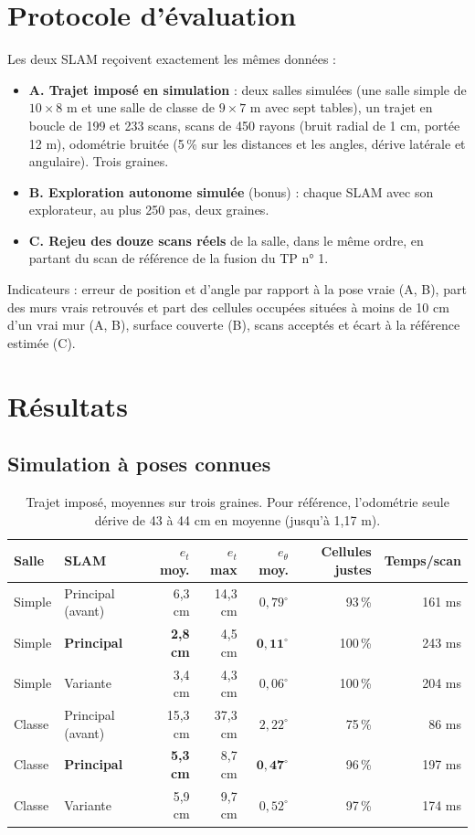 \documentclass[11pt,a4paper]{article}
\begin{document}
\section{Protocole d'évaluation}
Les deux SLAM reçoivent exactement les mêmes données :
\begin{itemize}
\item \textbf{A. Trajet imposé en simulation} : deux salles simulées (une
salle simple de $10\times8$ m et une salle de classe de $9\times7$ m avec
sept tables), un trajet en boucle de 199 et 233 scans, scans de 450 rayons
(bruit radial de 1 cm, portée 12 m), odométrie bruitée (5\,\% sur les
distances et les angles, dérive latérale et angulaire). Trois graines.
\item \textbf{B. Exploration autonome simulée} (bonus) : chaque SLAM avec son
explorateur, au plus 250 pas, deux graines.
\item \textbf{C. Rejeu des douze scans réels} de la salle, dans le même ordre,
en partant du scan de référence de la fusion du TP n° 1.
\end{itemize}
Indicateurs : erreur de position et d'angle par rapport à la pose vraie
(A, B), part des murs vrais retrouvés et part des cellules occupées situées
à moins de 10 cm d'un vrai mur (A, B), surface couverte (B), scans acceptés
et écart à la référence estimée (C).

\section{Résultats}
\subsection{Simulation à poses connues}
\begin{table}[htbp]
\centering
\caption{Trajet imposé, moyennes sur trois graines. Pour référence,
l'odométrie seule dérive de 43 à 44 cm en moyenne (jusqu'à 1,17 m).}
\begin{tabular}{llrrrrr}
\toprule
Salle & SLAM & $e_t$ moy. & $e_t$ max & $e_\theta$ moy. & Cellules justes & Temps/scan \\
\midrule
Simple & Principal (avant) & 6,3 cm & 14,3 cm & $0,79^\circ$ & 93\,\% & 161 ms \\
Simple & \textbf{Principal} & \textbf{2,8 cm} & 4,5 cm & $\mathbf{0,11^\circ}$ & 100\,\% & 243 ms \\
Simple & Variante & 3,4 cm & 4,3 cm & $0,06^\circ$ & 100\,\% & 204 ms \\
\midrule
Classe & Principal (avant) & 15,3 cm & 37,3 cm & $2,22^\circ$ & 75\,\% & 86 ms \\
Classe & \textbf{Principal} & \textbf{5,3 cm} & 8,7 cm & $\mathbf{0,47^\circ}$ & 96\,\% & 197 ms \\
Classe & Variante & 5,9 cm & 9,7 cm & $0,52^\circ$ & 97\,\% & 174 ms \\
\bottomrule
\end{tabular}
\end{table}
\end{document}
